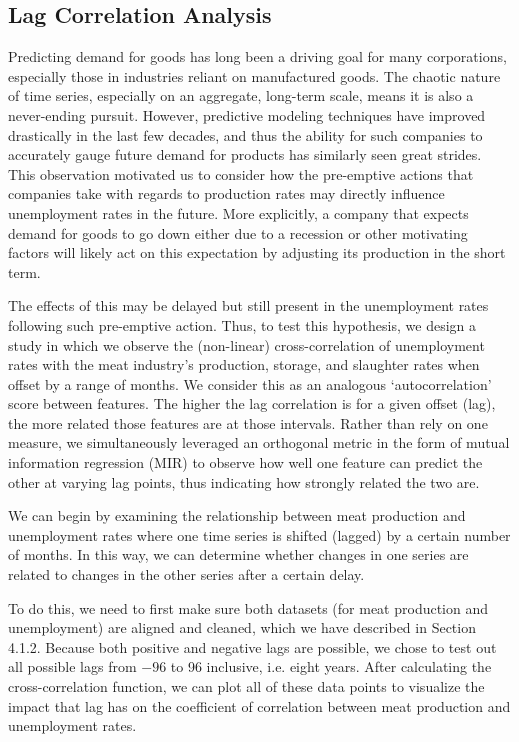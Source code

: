 \documentclass[12pt]{article}
\begin{document}
    \subsection{Lag Correlation Analysis}
    Predicting demand for goods has long been a driving goal for many corporations, especially those in industries reliant on manufactured goods. The chaotic nature of time series, especially on an aggregate, long-term scale, means it is also a never-ending pursuit. However, predictive modeling techniques have improved drastically in the last few decades, and thus the ability for such companies to accurately gauge future demand for products has similarly seen great strides. This observation motivated us to consider how the pre-emptive actions that companies take with regards to production rates may directly influence unemployment rates in the future. More explicitly, a company that expects demand for goods to go down either due to a recession or other motivating factors will likely act on this expectation by adjusting its production in the short term.

    The effects of this may be delayed but still present in the unemployment rates following such pre-emptive action. Thus, to test this hypothesis, we design a study in which we observe the (non-linear) cross-correlation of unemployment rates with the meat industry's production, storage, and slaughter rates when offset by a range of months. We consider this as an analogous `autocorrelation' score between features. The higher the lag correlation is for a given offset (lag), the more related those features are at those intervals. Rather than rely on one measure, we simultaneously leveraged an orthogonal metric in the form of mutual information regression (MIR) to observe how well one feature can predict the other at varying lag points, thus indicating how strongly related the two are.

    We can begin by examining the relationship between meat production and unemployment rates where one time series is shifted (lagged) by a certain number of months. In this way, we can determine whether changes in one series are related to changes in the other series after a certain delay.

    To do this, we need to first make sure both datasets (for meat production and unemployment) are aligned and cleaned, which we have described in Section 4.1.2. Because both positive and negative lags are possible, we chose to test out all possible lags from $-96$ to 96 inclusive, i.e. eight years. After calculating the cross-correlation function, we can plot all of these data points to visualize the impact that lag has on the coefficient of correlation between meat production and unemployment rates.
\end{document}
